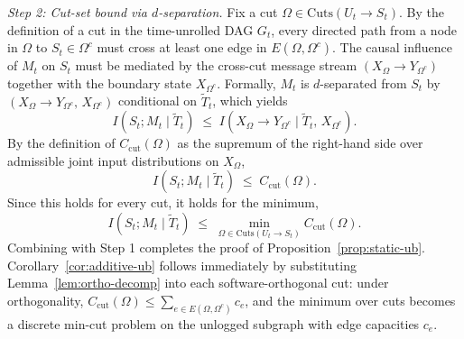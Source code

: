  \emph{Step 2: Cut-set bound via $d$-separation.} Fix a cut $\Omega \in
  \mathrm{Cuts}(U_t \to S_t)$. By the definition of a cut in the time-unrolled
  DAG $G_t$, every directed path from a node in $\Omega$ to $S_t \in \Omega^c$
  must cross at least one edge in $E(\Omega, \Omega^c)$. The causal influence of
   $M_t$ on $S_t$ must be mediated by the cross-cut message stream $(X_\Omega
  \to Y_{\Omega^c})$ together with the boundary state $X_{\Omega^c}$. Formally,
  $M_t$ is $d$-separated from $S_t$ by $(X_\Omega \to Y_{\Omega^c},\,
  X_{\Omega^c})$ conditional on $\tilde T_t$, which yields
  \[
    I(S_t; M_t \mid \tilde T_t) \;\leq\; I\!\left(X_\Omega \to Y_{\Omega^c}
  \;\Big|\; \tilde T_t,\, X_{\Omega^c}\right).
  \]
  By the definition of $C_\text{cut}(\Omega)$ as the supremum of the right-hand
  side over admissible joint input distributions on $X_\Omega$,
  \[
    I(S_t; M_t \mid \tilde T_t) \;\leq\; C_\text{cut}(\Omega).
  \]
  Since this holds for every cut, it holds for the minimum,
  \[
    I(S_t; M_t \mid \tilde T_t) \;\leq\; \min_{\Omega \in \mathrm{Cuts}(U_t \to
  S_t)} C_\text{cut}(\Omega).
  \]
  Combining with Step 1 completes the proof of Proposition~\ref{prop:static-ub}.
   Corollary~\ref{cor:additive-ub} follows immediately by substituting
  Lemma~\ref{lem:ortho-decomp} into each software-orthogonal cut: under
  orthogonality, $C_\text{cut}(\Omega) \leq \sum_{e \in E(\Omega, \Omega^c)}
  c_e$, and the minimum over cuts becomes a discrete min-cut problem on the
  unlogged subgraph with edge capacities $c_e$.
